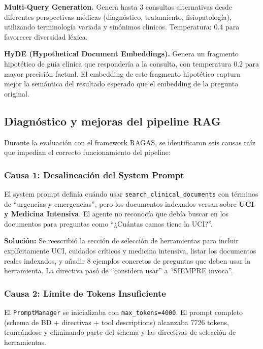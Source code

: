 \textbf{Multi-Query Generation.} Genera hasta 3 consultas alternativas desde diferentes perspectivas médicas (diagnóstico, tratamiento, fisiopatología), utilizando terminología variada y sinónimos clínicos. Temperatura: 0.4 para favorecer diversidad léxica.

\textbf{HyDE (Hypothetical Document Embeddings).} Genera un fragmento hipotético de guía clínica que respondería a la consulta, con temperatura 0.2 para mayor precisión factual. El embedding de este fragmento hipotético captura mejor la semántica del resultado esperado que el embedding de la pregunta original.

\subsection{Diagnóstico y mejoras del pipeline RAG}
\label{sec:appendix_rag_mejoras}

Durante la evaluación con el framework \ac{RAGAS}, se identificaron seis causas raíz que impedían el correcto funcionamiento del pipeline:

\subsubsection{Causa 1: Desalineación del System Prompt}

El system prompt definía cuándo usar \texttt{search\_clinical\_documents} con términos de ``urgencias y emergencias'', pero los documentos indexados versan sobre \textbf{UCI y Medicina Intensiva}. El agente no reconocía que debía buscar en los documentos para preguntas como ``¿Cuántas camas tiene la \ac{UCI}?''.

\textbf{Solución:} Se reescribió la sección de selección de herramientas para incluir explícitamente \ac{UCI}, cuidados críticos y medicina intensiva, listar los documentos reales indexados, y añadir 8 ejemplos concretos de preguntas que deben usar la herramienta. La directiva pasó de ``considera usar'' a ``SIEMPRE invoca''.

\subsubsection{Causa 2: Límite de Tokens Insuficiente}

El \texttt{PromptManager} se inicializaba con \texttt{max\_tokens=4000}. El prompt completo (schema de BD + directivas + tool descriptions) alcanzaba 7726 tokens, truncándose y eliminando parte del schema y las directivas de selección de herramientas.

